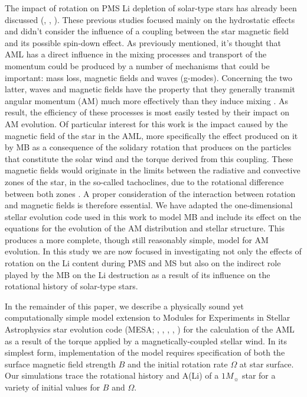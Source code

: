 \documentclass[fleqn,usenatbib]{mnras}
\begin{document}
The impact of rotation on PMS Li depletion of solar-type stars has already been discussed (\citet{Pinsonneault1997}, \citet{Jeffries2004}, \citet{Somers2014}). These previous studies focused mainly on the hydrostatic effects and didn't consider the influence of a coupling between the star magnetic field and its possible spin-down effect. As previously mentioned, it's thought that AML has a direct influence in the mixing processes and transport of the momentum could be produced by a number of mechanisms that could be important: mass loss, magnetic fields and waves (g-modes). Concerning the two latter, waves and magnetic fields have the property that they generally transmit angular momentum (AM) much more effectively than they induce mixing \citep{Denissenkov2007}. As result, the efficiency of these processes is most easily tested by their impact on AM evolution. Of particular interest for this work is the impact caused by the magnetic field of the star in the AML, more specifically the effect produced on it by MB as a consequence of the solidary rotation that produces on the particles that constitute the solar wind and the torque derived from this coupling. These magnetic fields would originate in the limits between the radiative and convective zones of the star, in the so-called tachoclines, due to the rotational difference between both zones \citep{Guerrero2016}. A proper consideration of the interaction between rotation and magnetic fields is therefore essential. We have adapted the one-dimensional stellar evolution code used in this work to model MB and include its effect on the equations for the evolution of the AM distribution and stellar structure. This produces a more complete, though still reasonably simple, model for AM evolution. In this study we are now focused in investigating not only the effects of rotation on the Li content during PMS and MS but also on the indirect role played by the MB on the Li destruction as a result of its influence on the rotational history of solar-type stars.\par

In the remainder of this paper, we describe a physically sound yet computationally simple model extension to Modules for Experiments in Stellar Astrophysics star evolution code (MESA; \citeauthor{Paxton2011} \citeyear{Paxton2011}, \citeyear{Paxton2013}, \citeyear{Paxton2015}, \citeyear{Paxton2018}, \citeyear{Paxton2019}) for the calculation of the AML as a result of the torque applied by a magnetically-coupled stellar wind. In its simplest form, implementation of the model requires specification of both the surface magnetic field strength $B$ and the initial  rotation rate $\Omega$ at star surface. Our simulations trace the rotational history and A(Li) of a $1 M_{\sun}$ star for a variety of initial values for $B$ and $\Omega$.\par
\end{document}
